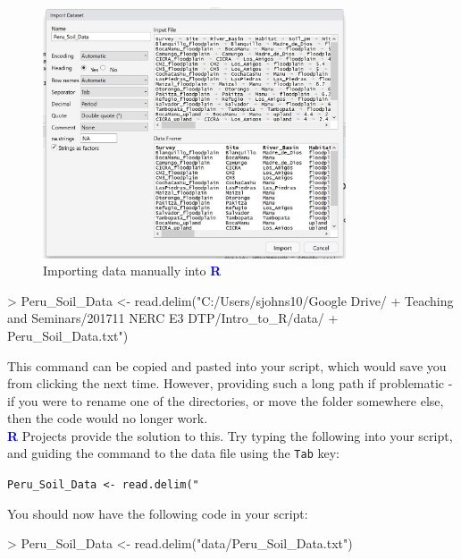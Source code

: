 \documentclass[a4paper,12pt]{article}
\newcommand\boldblue[1]{\textcolor{blue}{\textbf{#1}}}
\begin{document}
\begin{figure}[t]
	\centering 
	\includegraphics[width=0.8\textwidth]{figs/Import_Dataset2.JPG}
	\caption{Importing data manually into \boldblue{R}}
	\label{fig:Import_Dataset2}
\end{figure} 



\begin{shaded}
\begin{Schunk}
\begin{Sinput}
> Peru_Soil_Data <- read.delim("C:/Users/sjohns10/Google Drive/
+ Teaching and Seminars/201711 NERC E3 DTP/Intro_to_R/data/
+ Peru_Soil_Data.txt")
\end{Sinput}
\end{Schunk}
\end{shaded}

This command can be copied and pasted into your script, which would save you from clicking the next time. However, providing such a long path if problematic - if you were to rename one of the directories, or move the folder somewhere else, then the code would no longer work. \\

\boldblue{R} Projects provide the solution to this. Try typing the following into your script, and guiding the command to the data file using the \texttt{Tab} key:

\begin{shaded}
\texttt{Peru\_Soil\_Data <- read.delim("}
\end{shaded}

You should now have the following code in your script:

\begin{shaded}
\begin{Schunk}
\begin{Sinput}
> Peru_Soil_Data <- read.delim("data/Peru_Soil_Data.txt")
\end{Sinput}
\end{Schunk}
\end{shaded}
\end{document}
